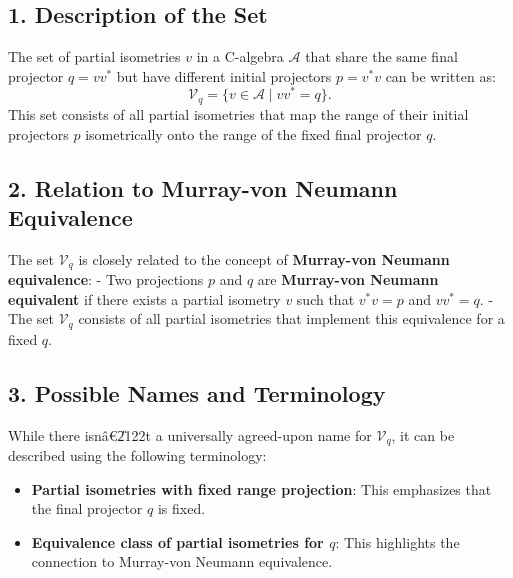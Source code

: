 \documentclass{article}
\begin{document}
\subsection*{1. Description of the Set}

The set of partial isometries $v $ in a C\*-algebra $\mathcal{A} $ that
share the same final projector $q = v v^* $ but have different initial
projectors $p = v^* v $ can be written as: 
\begin{equation*}
\mathcal{V}_q = \{ v \in \mathcal{A} \mid v v^* = q \}. 
\end{equation*}
This set consists of all partial isometries that map the range of their
initial projectors $p $ isometrically onto the range of the fixed final
projector $q $.

\subsection*{2. Relation to Murray-von Neumann Equivalence}

The set $\mathcal{V}_q $ is closely related to the concept of \textbf{%
Murray-von Neumann equivalence}: - Two projections $p $ and $q $ are \textbf{%
Murray-von Neumann equivalent} if there exists a partial isometry $v $ such
that $v^* v = p $ and $v v^* = q $. - The set $\mathcal{V}_q $ consists of
all partial isometries that implement this equivalence for a fixed $q $.

\subsection*{3. Possible Names and Terminology}

While there isn\^{a}\euro \U{2122}t a universally agreed-upon name for $%
\mathcal{V}_q $, it can be described using the following terminology:

\begin{itemize}
\item \textbf{Partial isometries with fixed range projection}: This
emphasizes that the final projector $q $ is fixed. 

\item \textbf{Equivalence class of partial isometries for $q$}: This
highlights the connection to Murray-von Neumann equivalence. 
\end{itemize}
\end{document}
